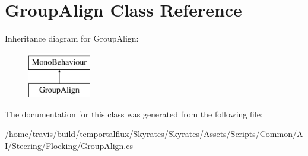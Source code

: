\hypertarget{class_group_align}{\section{Group\-Align Class Reference}
\label{class_group_align}
}
Inheritance diagram for Group\-Align\-:\begin{figure}[H]
\begin{center}
\leavevmode
\includegraphics[height=2.000000cm]{class_group_align}
\end{center}
\end{figure}


The documentation for this class was generated from the following file\-:\begin{DoxyCompactItemize}
\item 
/home/travis/build/temportalflux/\-Skyrates/\-Skyrates/\-Assets/\-Scripts/\-Common/\-A\-I/\-Steering/\-Flocking/Group\-Align.\-cs\end{DoxyCompactItemize}
